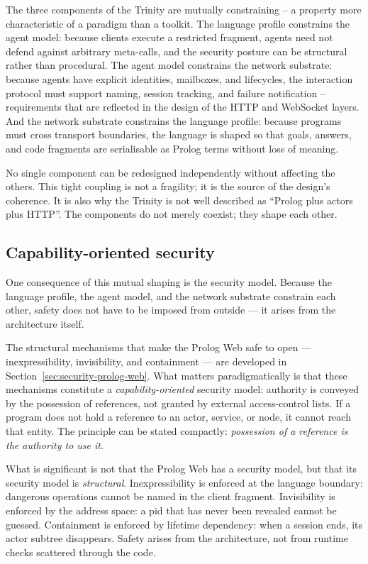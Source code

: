 The three components of the Trinity are mutually constraining -- a property more characteristic of a paradigm than a toolkit. The language profile constrains the agent model: because clients execute
a restricted fragment, agents need not defend against arbitrary
meta-calls, and the security posture can be structural rather than
procedural. The agent model constrains the network substrate: because
agents have explicit identities, mailboxes, and lifecycles, the
interaction protocol must support naming, session tracking, and failure
notification -- requirements that are reflected in the design of the
HTTP and WebSocket layers. And the network substrate constrains the
language profile: because programs must cross transport boundaries, the
language is shaped so that goals, answers, and code fragments are
serialisable as Prolog terms without loss of meaning.

No single component can be redesigned independently without affecting
the others. This tight coupling is not a fragility; it is the source of
the design's coherence. It is also why the Trinity is not well described
as ``Prolog plus actors plus HTTP''. The components do not merely
coexist; they shape each other.

\subsection{Capability-oriented security}\label{sec:capability-security}

One consequence of this mutual shaping is the security model. Because
the language profile, the agent model, and the network substrate
constrain each other, safety does not have to be imposed from outside
--- it arises from the architecture itself.

The structural mechanisms that make the Prolog Web safe to open ---
inexpressibility, invisibility, and containment --- are developed in
Section~\ref{sec:security-prolog-web}. What matters paradigmatically is
that these mechanisms constitute a \emph{capability-oriented} security
model: authority is conveyed by the possession of references, not
granted by external access-control lists. If a program does not hold a
reference to an actor, service, or node, it cannot reach that entity.
The principle can be stated compactly: \emph{possession of a reference
is the authority to use it}.

What is significant is not that the Prolog Web has a security model, but
that its security model is \emph{structural}. Inexpressibility is
enforced at the language boundary: dangerous operations cannot be named
in the client fragment. Invisibility is enforced by the address space: a
pid that has never been revealed cannot be guessed. Containment is
enforced by lifetime dependency: when a session ends, its actor subtree
disappears. Safety arises from the architecture, not from runtime checks
scattered through the code.

